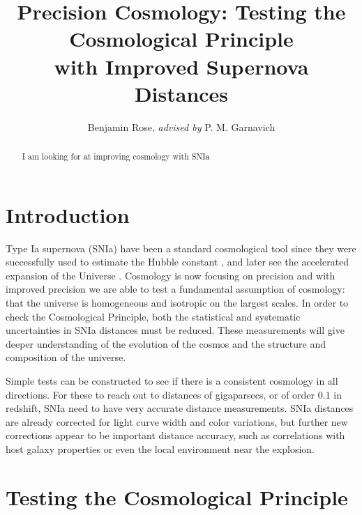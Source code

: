\documentclass[apj, iop]{emulateapj}
\newcommand{\sn}{SNIa}
\begin{document}
\title{Precision Cosmology: Testing the Cosmological Principle \\with Improved Supernova Distances}

\author{Benjamin Rose, {\it advised by} P. M. Garnavich}


\begin{abstract}
I am looking for at improving cosmology with \sn{}
\end{abstract}

\maketitle

\section{Introduction}\label{introduction} 

Type Ia supernova (\sn{}) have been a standard cosmological tool since they were
successfully used to estimate the Hubble constant \citep{Hamuy95,Riess95}, and
later see the accelerated expansion of the Universe
\citep{Riess98,Perlmutter99}. Cosmology is now focusing on precision and with
improved precision we are able to test a fundamental assumption of cosmology:
that the universe is homogeneous and isotropic on the largest scales. In order
to check the Cosmological Principle, both the statistical and systematic
uncertainties in \sn{} distances must be reduced. These measurements will give
deeper understanding of the evolution of the cosmos and the structure and
composition of the universe.

Simple tests can be constructed to see if there is a consistent cosmology in all
directions. For these to reach out to distances of gigaparsecs, or of order
$0.1$ in redshift, \sn{} need to have very accurate distance measurements. \sn{}
distances are already corrected for light curve width and color variations, but
further new corrections appear to be important distance accuracy, such as
correlations with host galaxy properties or even the local environment near the
explosion.

\section{Testing the Cosmological Principle}\label{testing-the-cosmological-principle}
\end{document}
